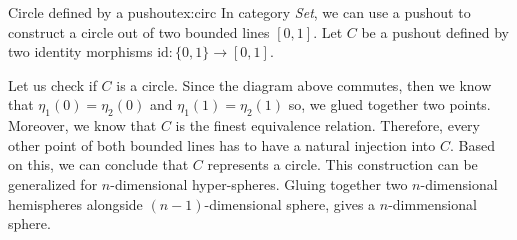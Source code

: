 \begin{example}{Circle defined by a pushout}{ex:circ}
In category \emph{Set}, we can use a pushout to construct a circle out of two bounded lines $[0, 1]$. Let $C$ be a pushout defined by two identity morphisms $\textrm{id}: \{0, 1\} \rightarrow  [0, 1]$.

\begin{center}
\end{center}
Let us check if $C$ is a circle. Since the diagram above commutes, then we know that $\eta_1(0) = \eta_2(0)$ and $\eta_1(1) = \eta_2(1)$ so, we glued together two points. Moreover, we know that $C$ is the finest equivalence relation. Therefore, every other point of both bounded lines has to have a natural injection into $C$. Based on this, we can conclude that $C$ represents a circle. This construction can be generalized for $n$-dimensional hyper-spheres. Gluing together two $n$-dimensional hemispheres alongside $(n-1)$-dimensional sphere, gives a $n$-dimmensional sphere.
\end{example}

